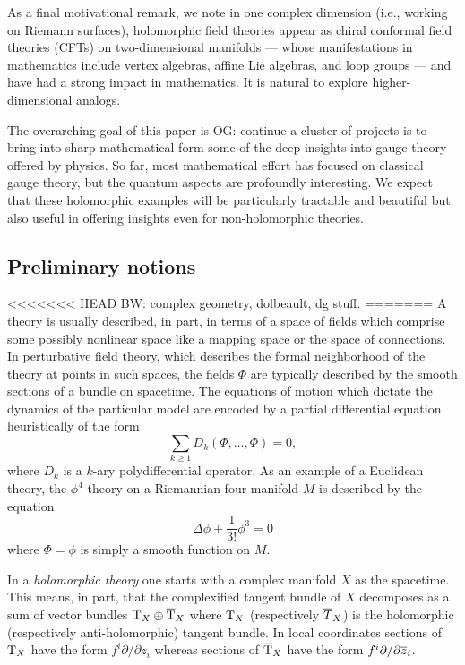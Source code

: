 \documentclass[11pt]{amsart}
\def\del{\partial}
\def\brian#1{{\textcolor{blue!65!red}{BW: {#1}}}}
\def\owen#1{{\textcolor{violet!65!black}{OG: {#1}}}}
\begin{document}
As a final motivational remark, we note in one complex dimension (i.e., working on Riemann surfaces), holomorphic field theories appear as chiral conformal field theories (CFTs) on two-dimensional manifolds --- whose manifestations in mathematics include vertex algebras, affine Lie algebras, and loop groups --- and have had a strong impact in mathematics.
It is natural to explore higher-dimensional analogs.

The overarching goal of this paper is \owen{continue}
a cluster of projects is to bring into sharp mathematical form some of the deep insights into gauge theory offered by physics.
So far, most mathematical effort has focused on classical gauge theory,
but the quantum aspects are profoundly interesting.
We expect that these holomorphic examples will be particularly tractable and beautiful but also useful in offering insights even for non-holomorphic theories.

\subsection{Preliminary notions}

<<<<<<< HEAD
\brian{complex geometry, dolbeault, dg stuff.}
=======
A theory is usually described, in part, in terms of a space of fields which comprise some possibly nonlinear space like a mapping space or the space of connections. 
In perturbative field theory, which describes the formal neighborhood of the theory at points in such spaces, the fields $\Phi$ are typically described by the smooth sections of a bundle on spacetime.
The equations of motion which dictate the dynamics of the particular model are encoded by a partial differential equation heuristically of the form 
\[
\sum_{k \geq 1} D_k(\Phi,\ldots,\Phi) = 0 ,
\]
where $D_k$ is a $k$-ary polydifferential operator.
As an example of a Euclidean theory, the $\phi^4$-theory on a Riemannian four-manifold $M$ is described by the equation
\[
\Delta \phi + \frac{1}{3!} \phi^3 = 0 
\]
where $\Phi = \phi$ is simply a smooth function on $M$.
 
In a {\em holomorphic theory} one starts with a complex manifold $X$ as the spacetime.
This means, in part, that the complexified tangent bundle of $X$ decomposes as a sum of vector bundles $\T_X \oplus \Bar{\T}_X$ where $\T_X$ (respectively $\Bar{T}_X$) is the holomorphic (respectively anti-holomorphic) tangent bundle.
In local coordinates sections of $\T_X$ have the form $f^i \del / \del z_i$ whereas sections of $\Bar{\T}_X$ have the form $f^i \del / \del \zbar_i$. 
\end{document}
